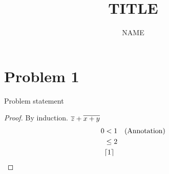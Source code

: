 \documentclass{article}
\title{TITLE}
\author{NAME}
\begin{document}
	\section*{Problem 1}
    \begin{theorem}
        Problem statement
    \end{theorem}
    \begin{proof}
        By induction.
        $\overline{z} + \overline{x+y}$
        \begin{align*}
            0 &< 1 &&\text{(Annotation)} \\
            &\leq 2  \\
            &\lceil1\rceil 
        \end{align*}
    \end{proof}
\end{document}
